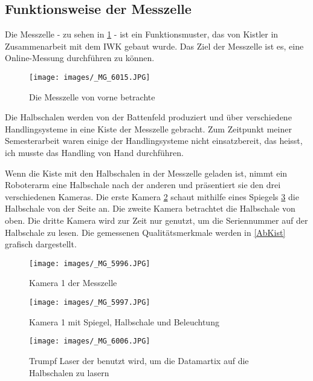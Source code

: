 \subsection{Funktionsweise der Messzelle}

Die Messzelle - zu sehen in \ref{fig:GesamtMessZell} - ist ein Funktionsmuster, das von Kistler in Zusammenarbeit mit dem IWK gebaut wurde. Das Ziel der Messzelle ist es, eine Online-Messung durchführen zu können.

\begin{figure}
   
  \texttt{[image: images/\_MG\_6015.JPG]}
  \caption{Die Messzelle von vorne betrachte}
  \label{fig:GesamtMessZell}
\end{figure}

Die Halbschalen werden von der Battenfeld produziert und über verschiedene Handlingsysteme in eine Kiste der Messzelle gebracht. Zum Zeitpunkt meiner Semesterarbeit waren einige der Handlingsysteme nicht einsatzbereit, das heisst, ich musste das Handling von Hand durchführen.

Wenn die Kiste mit den Halbschalen in der Messzelle geladen ist, nimmt ein Roboterarm eine Halbschale nach der anderen und präsentiert sie den drei verschiedenen Kameras. Die erste Kamera \ref{fig:Kam1wide} schaut mithilfe eines Spiegels \ref{fig:Kam1} die Halbschale von der Seite an. Die zweite Kamera betrachtet die Halbschale von oben. Die dritte Kamera wird zur Zeit nur genutzt, um die Seriennummer auf der Halbschale zu lesen. Die gemessenen Qualitätsmerkmale werden in \ref{AbKist} grafisch dargestellt.

\begin{figure}%
   
  \texttt{[image: images/\_MG\_5996.JPG]}
  \caption{Kamera 1 der Messzelle}
  \label{fig:Kam1wide}
\end{figure}

\begin{figure}%
   
  \texttt{[image: images/\_MG\_5997.JPG]}
  \caption{Kamera 1 mit Spiegel, Halbschale und Beleuchtung}
  \label{fig:Kam1}
\end{figure}

\begin{figure}%
   
  \texttt{[image: images/\_MG\_6006.JPG]}
  \caption{Trumpf Laser der benutzt wird, um die Datamartix auf die Halbschalen zu lasern}
  \label{fig:Laser}
\end{figure}




